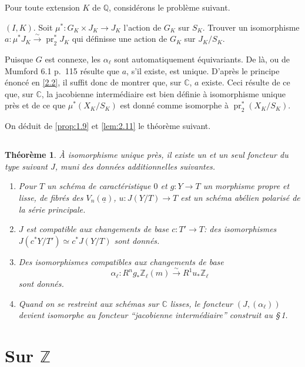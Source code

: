 \documentclass[10pt,leqno]{amsart}
\theoremstyle{plain}
\newtheorem{theorem}{Th\'eor\`eme}
\theoremstyle{definition}
\theoremstyle{remark}
\DeclareMathOperator{\pr}{pr}
\newcommand{\ZZ}{\mathbb{Z}}
\newcommand{\QQ}{\mathbb{Q}}
\newcommand{\CC}{\mathbb{C}}
\newcommand{\ua}{\underline{a}}
\begin{document}
Pour toute extension $K$ de $\QQ$, consid\'erons le probl\`eme suivant.

\smallskip

$(I,K)$. Soit $\mu^*\colon G_K\times J_K\to J_K$ l'action de $G_K$ sur $S_K$. Trouver un isomorphisme $a\colon\mu^*J_K\xrightarrow{\sim}\pr_2^*J_K$ qui d\'efinisse une action de $G_K$ sur $J_K/S_K$.

\smallskip

Puisque $G$ est connexe, les $\alpha_\ell$ sont automatiquement \'equivariants. De l\`a, ou de Mumford \cite{9} 6.1 p.~115 r\'esulte que $a$, s'il existe, est unique. D'apr\`es le principe \'enonc\'e en \ref{2.2}, il suffit donc de montrer que, sur $\CC$, $a$ existe. Ceci r\'esulte de ce que, sur $\CC$, la jacobienne interm\'ediaire est bien d\'efinie \`a isomorphisme unique pr\`es et de ce que $\mu^*(X_K/S_K)$ est donn\'e comme isomorphe \`a $\pr_2^*(X_K/S_K)$.

On d\'eduit de \ref{prop:1.9} et \ref{lem:2.11} le th\'eor\`eme suivant.

\subsection{}\label{2.12}

\begin{theorem}\label{thm:2.12}
\`A isomorphisme unique pr\`es, il existe un et un seul foncteur du type suivant $J$, muni des donn\'ees additionnelles suivantes.
\begin{enumerate}
\item[a)] Pour $T$ un sch\'ema de caract\'eristique $0$ et $g\colon Y\to T$ un morphisme propre et lisse, de fibr\'es des $V_n(\ua)$, $u\colon J(Y/T)\to T$ est un sch\'ema ab\'elien polaris\'e de la s\'erie principale.
\item[b)] $J$ est compatible aux changements de base $c\colon T'\to T$: des isomorphismes $J(c^*Y/T')\simeq c^*J(Y/T)$ sont donn\'es.
\item[c)] Des isomorphismes compatibles aux changements de base
\[
\alpha_\ell\colon R^ng_*\ZZ_\ell(m)\xrightarrow{\sim}R^1u_*\ZZ_\ell
\]
sont donn\'es.
\item[d)] Quand on se restreint aux sch\'emas sur $\CC$ lisses, le foncteur $(J,(\alpha_\ell))$ devient isomorphe au foncteur ``jacobienne interm\'ediaire'' construit au \S\,1.
\end{enumerate}
\end{theorem}

\section{Sur $\ZZ$}
\end{document}
